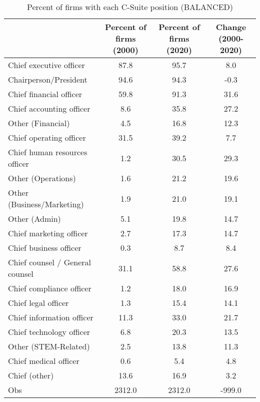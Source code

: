 \begin{table}[htbp]\centering
\caption{Percent of firms with each C-Suite position (BALANCED)\label{tab98}}
\begin{tabular}{l*{3}{c}}
\toprule
                    &Percent of firms (2000)&Percent of firms (2020)&Change (2000-2020)\\
\midrule
Chief executive officer&        87.8&        95.7&         8.0\\
Chairperson/President&        94.6&        94.3&        -0.3\\
Chief financial officer&        59.8&        91.3&        31.6\\
Chief accounting officer&         8.6&        35.8&        27.2\\
Other (Financial)   &         4.5&        16.8&        12.3\\
Chief operating officer&        31.5&        39.2&         7.7\\
Chief human resources officer&         1.2&        30.5&        29.3\\
Other (Operations)  &         1.6&        21.2&        19.6\\
Other (Business/Marketing)&         1.9&        21.0&        19.1\\
Other (Admin)       &         5.1&        19.8&        14.7\\
Chief marketing officer&         2.7&        17.3&        14.7\\
Chief business officer&         0.3&         8.7&         8.4\\
Chief counsel / General counsel&        31.1&        58.8&        27.6\\
Chief compliance officer&         1.2&        18.0&        16.9\\
Chief legal officer &         1.3&        15.4&        14.1\\
Chief information officer&        11.3&        33.0&        21.7\\
Chief technology officer&         6.8&        20.3&        13.5\\
Other (STEM-Related)&         2.5&        13.8&        11.3\\
Chief medical officer&         0.6&         5.4&         4.8\\
Chief (other)       &        13.6&        16.9&         3.2\\
Obs                 &      2312.0&      2312.0&      -999.0\\
\bottomrule

\end{tabular}
\end{table}
